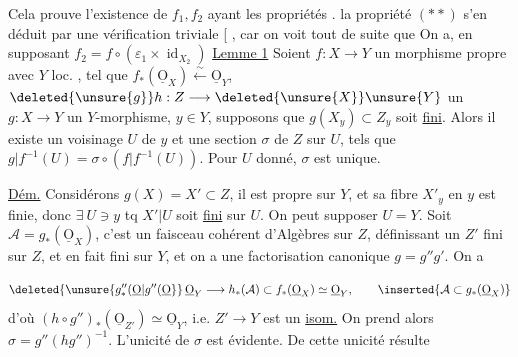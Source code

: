 Cela prouve l'existence de $f_1,f_2$ ayant les propriétés  \inserted{$(*)$}.  la propriété $(**)$ s'en déduit par une vérification triviale   [     , car on voit tout de suite que   On a, en supposant $f_2=f\circ(\varepsilon_1\times\operatorname{id}_{X_2})$
\uline{Lemme 1} Soient $f:X\longrightarrow Y$ un morphisme propre avec $Y$ loc. , tel que $f_*(\underline{\mathrm O}_X)\xleftarrow{\sim}\underline{\mathrm O}_Y$,  $\deleted{\unsure{g}}h:Z\longrightarrow\deleted{\unsure{X}}\unsure{Y}$ un   $g:X\longrightarrow Y$ un $Y$-morphisme,  $y\in Y$, supposons que $g(X_y)\subset Z_y$ soit \uline{fini}. Alors il existe un voisinage  $U$ de $y$ et une section $\sigma$ de $Z$ sur $U$, tels que $g|f^{-1}(U)=\sigma\circ(f|f^{-1}(U))$. Pour $U$ donné, $\sigma$ est unique.


\uline{Dém.} Considérons $g(X)=X'\subset Z$, il est propre sur $Y$, et sa fibre $X'_y$ en $y$ est finie, donc $\exists\ U\ni y$ tq $X'|U$ soit \uline{fini} sur $U$. On peut supposer $U=Y$. Soit $\mathcal A=g_*(\underline{\mathrm O}_X)$, c'est un faisceau cohérent d'Algèbres sur $Z$, définissant un $Z'$ fini sur $Z$, et en fait fini sur $Y$, et on a une factorisation canonique $g=g''g'$. On a

\[
\deleted{\unsure{g''_{*}(\underline{\mathrm O}|g''(\underline{\mathrm O}}}\,
\underline{\mathrm O}_{Y}\longrightarrow h_*(\mathcal A)
\subset f_*(\underline{\mathrm O}_X)\simeq\underline{\mathrm O}_Y,
\qquad\inserted{\mathcal A\subset g_*(\underline{\mathrm O}_X)}
\]
d'où $(h\circ g'')_*(\underline{\mathrm O}_{Z'})\simeq\underline{\mathrm O}_Y$, i.e. $Z'\longrightarrow Y$ est un \uline{isom.} On prend alors $\sigma=g''(hg'')^{-1}$. L'unicité  de $\sigma$ est évidente. De cette unicité résulte

